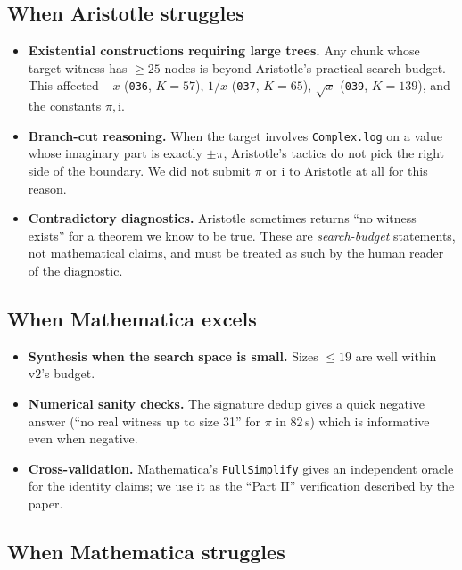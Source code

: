 \documentclass[11pt,a4paper]{article}
\theoremstyle{plain}
\theoremstyle{definition}
\newcommand{\imu}{\mathrm{i}}
\begin{document}
\subsection{When Aristotle struggles}

\begin{itemize}[leftmargin=*]
\item \textbf{Existential constructions requiring large trees.}  Any
chunk whose target witness has $\ge 25$ nodes is beyond Aristotle's
practical search budget.  This affected $-x$ (\texttt{036}, $K=57$),
$1/x$ (\texttt{037}, $K=65$), $\sqrt{x}$ (\texttt{039}, $K=139$), and
the constants $\pi,\imu$.
\item \textbf{Branch-cut reasoning.}  When the target involves
\texttt{Complex.log} on a value whose imaginary part is exactly
$\pm\pi$, Aristotle's tactics do not pick the right side of the
boundary.  We did not submit $\pi$ or $\imu$ to Aristotle at all for
this reason.
\item \textbf{Contradictory diagnostics.}  Aristotle sometimes returns
``no witness exists'' for a theorem we know to be true.  These are
\emph{search-budget} statements, not mathematical claims, and must be
treated as such by the human reader of the diagnostic.
\end{itemize}

\subsection{When Mathematica excels}

\begin{itemize}[leftmargin=*]
\item \textbf{Synthesis when the search space is small.}  Sizes
$\le 19$ are well within v2's budget.
\item \textbf{Numerical sanity checks.}  The signature dedup gives a
quick negative answer (``no real witness up to size 31'' for $\pi$ in
82\,s) which is informative even when negative.
\item \textbf{Cross-validation.}  Mathematica's \texttt{FullSimplify}
gives an independent oracle for the identity claims; we use it as the
``Part II'' verification described by the paper.
\end{itemize}

\subsection{When Mathematica struggles}
\end{document}
